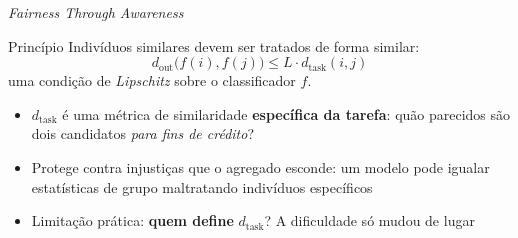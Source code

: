 \documentclass[aspectratio=169,xcolor=dvipsnames]{beamer}
\begin{document}
  \begin{frame}{\textit{Fairness Through Awareness}}
    \begin{block}{Princípio}
      Indivíduos similares devem ser tratados de forma similar:
      \[
        d_{\text{out}}\big(f(i), f(j)\big) \leq L \cdot d_{\text{task}}(i, j)
      \]
      uma condição de \textit{Lipschitz} sobre o classificador $f$.
    \end{block}

    \vspace{0.4em}
    \begin{itemize}\setlength{\itemsep}{0.3em}
      \item $d_{\text{task}}$ é uma métrica de similaridade \textbf{específica da tarefa}: quão parecidos são dois candidatos \textit{para fins de crédito}?
      \item Protege contra injustiças que o agregado esconde: um modelo pode igualar estatísticas de grupo maltratando indivíduos específicos
      \item Limitação prática: \textbf{quem define} $d_{\text{task}}$? A dificuldade só mudou de lugar
    \end{itemize}
  \end{frame}
\end{document}
